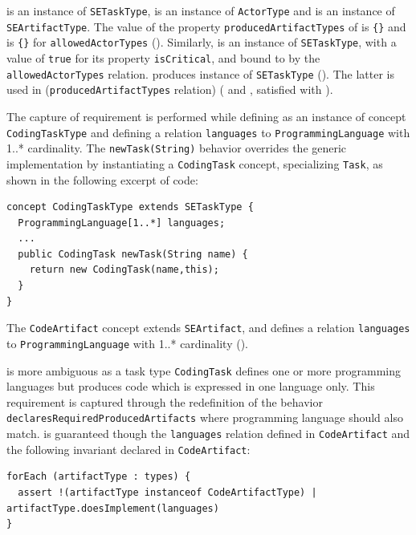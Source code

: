 
 is an instance of \texttt{SETaskType},
 is an instance of \texttt{ActorType} and  is an instance of \texttt{SEArtifactType}. The value of the
property \texttt{producedArtifactTypes} of  is
\texttt{\{}\texttt{\}} and is
\texttt{\{}\texttt{\}} for \texttt{allowedActorTypes}
(). Similarly,  is an instance of
\texttt{SETaskType}, with a value of \texttt{true} for its property
\texttt{isCritical}, and bound to  by the
\texttt{allowedActorTypes} relation.  produces
 instance of \texttt{SETaskType} (). The latter is
used in  (\texttt{producedArtifactTypes} relation)
( and , satisfied with ).

The capture of  requirement is performed while defining
 as an instance of concept \texttt{CodingTaskType} and defining a
relation \texttt{languages} to \texttt{ProgrammingLanguage} with 1..*
cardinality.  The \texttt{newTask(String)} behavior overrides the generic
implementation by instantiating a \texttt{CodingTask} concept, specializing
\texttt{Task}, as shown in the following excerpt of \FML code:

\begin{lstlisting}
concept CodingTaskType extends SETaskType {
  ProgrammingLanguage[1..*] languages;
  ...
  public CodingTask newTask(String name) {
    return new CodingTask(name,this);
  }
}
\end{lstlisting}

The \texttt{CodeArtifact} concept extends \texttt{SEArtifact}, and defines a
relation \texttt{languages} to \texttt{ProgrammingLanguage} with 1..*
cardinality ().

 is more ambiguous as a task type \texttt{CodingTask} defines one or
more programming languages but produces code which is expressed in one language
only. This requirement is captured through the redefinition of the behavior
\texttt{declaresRequiredProducedArtifacts} where programming language should
also match.   is guaranteed though the \texttt{languages} relation
defined in \texttt{CodeArtifact} and the following invariant declared in
\texttt{CodeArtifact}:
\begin{lstlisting}
forEach (artifactType : types) {
  assert !(artifactType instanceof CodeArtifactType) | artifactType.doesImplement(languages)
}
\end{lstlisting}

